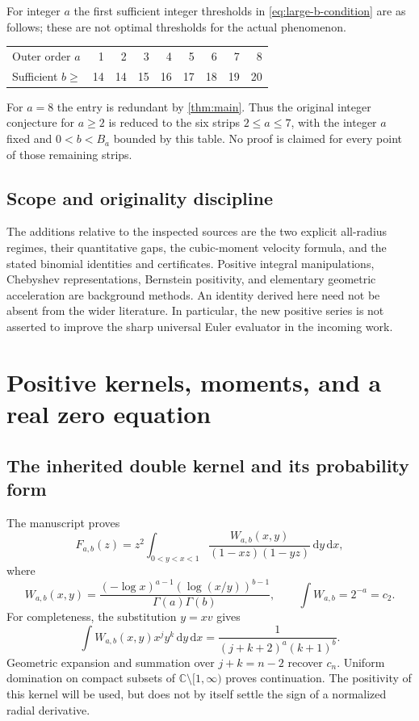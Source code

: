 \documentclass[11pt,letterpaper]{article}
\numberwithin{equation}{section}
\theoremstyle{definition}
\theoremstyle{remark}
\newcommand{\C}{\mathbb C}
\newcommand{\dd}{\,\mathrm d}
\newcommand{\cut}{\C\setminus[1,\infty)}
\begin{document}
For integer $a$ the first sufficient integer thresholds in
\eqref{eq:large-b-condition} are as follows; these are not optimal
thresholds for the actual phenomenon.
\begin{center}
\begin{tabular}{@{}lrrrrrrrr@{}}
\toprule
Outer order $a$ &1&2&3&4&5&6&7&8\\
Sufficient $b\ge$&14&14&15&16&17&18&19&20\\
\bottomrule
\end{tabular}
\end{center}
For $a=8$ the entry is redundant by \cref{thm:main}. Thus the original
integer conjecture for $a\ge2$ is reduced to the six strips
$2\le a\le7$, with the integer $a$ fixed and $0<b<B_a$ bounded by this
table. No proof is claimed for every point of those remaining strips.

\subsection{Scope and originality discipline}
The additions relative to the inspected sources are the two explicit
all-radius regimes, their quantitative gaps, the cubic-moment velocity
formula, and the stated binomial identities and certificates.
Positive integral manipulations, Chebyshev representations, Bernstein
positivity, and elementary geometric acceleration are background
methods. An identity derived here need not be absent from the wider
literature. In particular, the new positive series is not asserted to
improve the sharp universal Euler evaluator in the incoming work.

\section{Positive kernels, moments, and a real zero equation}
\label{sec:kernels}
\subsection{The inherited double kernel and its probability form}
The manuscript proves \cite{repo-kernel}
\begin{equation}\label{eq:double}
 F_{a,b}(z)=z^2\int_{0<y<x<1}
 \frac{W_{a,b}(x,y)}{(1-xz)(1-yz)}\dd y\dd x,
\end{equation}
where
\begin{equation}\label{eq:weight}
 W_{a,b}(x,y)=
 \frac{(-\log x)^{a-1}(\log(x/y))^{b-1}}{\Gamma(a)\Gamma(b)},
 \qquad \int W_{a,b}=2^{-a}=c_2.
\end{equation}
For completeness, the substitution $y=xv$ gives
\[
 \int W_{a,b}(x,y)x^j y^k\dd y\dd x
   =\frac1{(j+k+2)^a(k+1)^b}.
\]
Geometric expansion and summation over $j+k=n-2$ recover $c_n$.
Uniform domination on compact subsets of $\cut$ proves continuation.
The positivity of this kernel will be used, but does not by itself
settle the sign of a normalized radial derivative.
\end{document}
